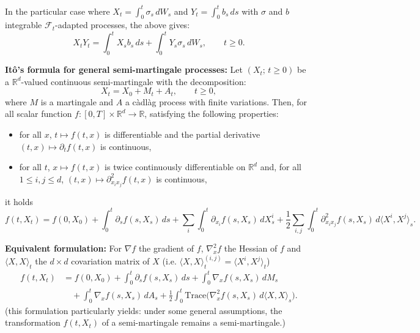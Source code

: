 \documentclass[11pt]{article}
\theoremstyle{remark}
\begin{document}
In the particular case where $X_t=\int_0^t \sigma_s\,dW_s$ and $Y_t=\int_0^t b_s\,ds$ with $\sigma$ and $b$ integrable $\mathcal{F}_t$-adapted processes, the above gives:
\[
X_tY_t=\int_0^t X_sb_s\,ds+\int_0^t Y_s\sigma_s\,dW_s,\qquad t\ge0.
\]

\noindent\textbf{It\^o's formula for general semi-martingale processes:}
Let $(X_t;\,t\ge0)$ be a $\mathbb{R}^d$-valued continuous semi-martingale with the decomposition:
\[
X_t=X_0+M_t+A_t,\qquad t\ge0,
\]
where $M$ is a martingale and $A$ a c\`adl\`ag process with finite variations. Then, for all scalar function
$f:[0,T]\times\mathbb{R}^d\to\mathbb{R}$, satisfying the following properties:
\begin{itemize}
\item for all $x$, $t\mapsto f(t,x)$ is differentiable and the partial derivative $(t,x)\mapsto \partial_t f(t,x)$ is continuous,
\item for all $t$, $x\mapsto f(t,x)$ is twice continuously differentiable on $\mathbb{R}^d$ and, for all $1\le i,j\le d$, $(t,x)\mapsto \partial_{x_i x_j}^2 f(t,x)$ is continuous,
\end{itemize}
it holds
\[
f(t,X_t)=f(0,X_0)+\int_0^t \partial_s f(s,X_s)\,ds+\sum_i\int_0^t \partial_{x_i}f(s,X_s)\,dX_s^i+\frac{1}{2}\sum_{i,j}\int_0^t \partial_{x_i x_j}^2 f(s,X_s)\,d\langle X^i,X^j\rangle_s.
\]

\noindent\textbf{Equivalent formulation:}
For $\nabla f$ the gradient of $f$, $\nabla_x^2f$ the Hessian of $f$ and $\langle X,X\rangle_t$ the $d\times d$ covariation matrix of $X$ (i.e. $\langle X,X\rangle_t^{(i,j)}=\langle X^i,X^j\rangle_t$)
\[
\begin{aligned}
f(t,X_t)
&=f(0,X_0)+\int_0^t \partial_s f(s,X_s)\,ds+\int_0^t \nabla_x f(s,X_s)\,dM_s \\
&\quad +\int_0^t \nabla_x f(s,X_s)\,dA_s+\frac{1}{2}\int_0^t \mathrm{Trace}\bigl(\nabla_x^2 f(s,X_s)\,d\langle X,X\rangle_s\bigr).
\end{aligned}
\]
(this formulation particularly yields: under some general assumptions, the transformation $f(t,X_t)$ of a semi-martingale remains a semi-martingale.)


\end{document}

